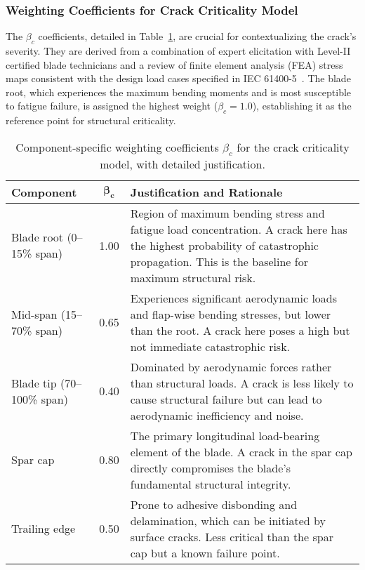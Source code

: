 \documentclass[energies,supfile,submit,pdftex,moreauthors]{Definitions/mdpi}
\begin{document}
\subsubsection{Weighting Coefficients for Crack Criticality Model}
The \(\beta_c\) coefficients, detailed in Table~\ref{tab:beta_coeff}, are crucial for contextualizing the crack's severity. They are derived from a combination of expert elicitation with Level-II certified blade technicians and a review of finite element analysis (FEA) stress maps consistent with the design load cases specified in IEC 61400-5~\cite{iec61400-5}. The blade root, which experiences the maximum bending moments and is most susceptible to fatigue failure, is assigned the highest weight (\(\beta_c = 1.0\)), establishing it as the reference point for structural criticality.

\begin{table}[!htb]
\caption{Component-specific weighting coefficients \(\beta_c\) for the crack criticality model, with detailed justification.}
\label{tab:beta_coeff}
\centering
\begin{tabularx}{\textwidth}{l c X}
\toprule
\textbf{Component} & \(\boldsymbol{\beta_c}\) & \textbf{Justification and Rationale} \\
\midrule
Blade root (0–15\% span) & 1.00 & Region of maximum bending stress and fatigue load concentration. A crack here has the highest probability of catastrophic propagation. This is the baseline for maximum structural risk. \\
Mid-span (15–70\% span)   & 0.65 & Experiences significant aerodynamic loads and flap-wise bending stresses, but lower than the root. A crack here poses a high but not immediate catastrophic risk. \\
Blade tip (70–100\% span) & 0.40 & Dominated by aerodynamic forces rather than structural loads. A crack is less likely to cause structural failure but can lead to aerodynamic inefficiency and noise. \\
Spar cap               & 0.80 & The primary longitudinal load-bearing element of the blade. A crack in the spar cap directly compromises the blade's fundamental structural integrity. \\
Trailing edge         & 0.50 & Prone to adhesive disbonding and delamination, which can be initiated by surface cracks. Less critical than the spar cap but a known failure point. \\
\bottomrule
\end{tabularx}
\end{table}
\end{document}
